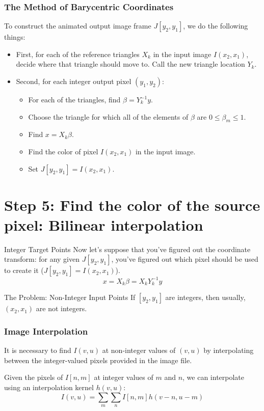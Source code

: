 \documentclass{beamer}
\begin{document}
\begin{frame}
  \frametitle{The Method of Barycentric Coordinates}
  To construct the animated output image frame $J[y_2,y_1]$, we do
  the following things:
  \begin{itemize}
  \item First, for each of the reference triangles $X_k$ in the input
    image $I(x_2,x_1)$, decide where that triangle
    should move to.  Call the new triangle location $Y_k$.
  \item Second, for each integer output pixel $(y_1,y_2)$:
    \begin{itemize}
    \item For each of the triangles, find $\beta=Y_k^{-1}y$.
    \item Choose the triangle for which all of the elements of $\beta$
      are $0\le\beta_m\le 1$.
    \item Find $x=X_k\beta$.
    \item Find the color of pixel $I(x_2,x_1)$ in the input image.
    \item Set $J[y_2,y_1]=I(x_2,x_1)$.
    \end{itemize}
  \end{itemize}
\end{frame}


\section[Image interpolation]{Step 5: Find the color of the source pixel: Bilinear interpolation}
\setcounter{subsection}{1}

\begin{frame}
  \begin{block}{Integer Target Points}
    Now let's suppose that you've figured out the coordinate transform:
    for any given $J[y_2,y_1]$, you've figured out which pixel should be used to create it 
    ($J[y_2,y_1]=I(x_2,x_1)$).
    \begin{displaymath}
      x=X_k\beta=X_kY_k^{-1}y
    \end{displaymath}
  \end{block}
  \begin{block}{The Problem: Non-Integer Input Points}
    If $[y_2,y_1]$ are integers, then usually, $(x_2,x_1)$ are not integers.
  \end{block}
\end{frame}

\begin{frame}
  \frametitle{Image Interpolation}

  It is necessary to find $I(v,u)$ at non-integer values of $(v,u)$ by
  interpolating between the integer-valued pixels provided in the image file. 

  Given the pixels of $I[n,m]$ at integer values of $m$ and $n$, we
  can interpolate using an interpolation kernel $h(v,u)$:
  \[
  I(v,u) = \sum_m\sum_n I[n,m] h(v-n,u-m)
  \]
\end{frame}
\end{document}

